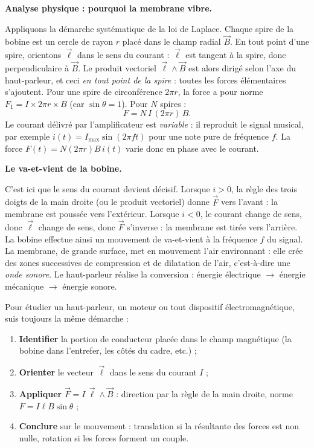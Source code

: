 \documentclass[11pt]{article}
\newcommand{\cle}[1]{{\popxbold\color{popdark}#1}}
\begin{document}
\textbf{Analyse physique : pourquoi la membrane vibre.}\par
Appliquons la démarche systématique de la loi de Laplace. Chaque spire de la bobine est un cercle de rayon $r$ placé dans le champ radial $\vec{B}$. En tout point d'une spire, orientons $\vec{\ell}$ dans le sens du courant : $\vec{\ell}$ est tangent à la spire, donc perpendiculaire à $\vec{B}$. Le produit vectoriel $\vec{\ell} \wedge \vec{B}$ est alors dirigé selon l'axe du haut-parleur, et ceci \emph{en tout point de la spire} : toutes les forces élémentaires s'ajoutent. Pour une spire de circonférence $2\pi r$, la force a pour norme $F_1 = I \times 2\pi r \times B$ (car $\sin\theta = 1$). Pour $N$ spires :
\[ F = N\,I\,(2\pi r)\,B. \]
Le courant délivré par l'amplificateur est \emph{variable} : il reproduit le signal musical, par exemple $i(t) = I_{\max}\sin(2\pi f t)$ pour une note pure de fréquence $f$. La force $F(t) = N(2\pi r)B\,i(t)$ varie donc en phase avec le courant.

\textbf{Le va-et-vient de la bobine.}\par
C'est ici que le sens du courant devient décisif. Lorsque $i > 0$, la règle des trois doigts de la main droite (ou le produit vectoriel) donne $\vec{F}$ vers l'avant : la membrane est poussée vers l'extérieur. Lorsque $i < 0$, le courant change de sens, donc $\vec{\ell}$ change de sens, donc $\vec{F}$ s'inverse : la membrane est tirée vers l'arrière. La bobine effectue ainsi un \cle{mouvement de va-et-vient} à la fréquence $f$ du signal. La membrane, de grande surface, met en mouvement l'air environnant : elle crée des zones successives de compression et de dilatation de l'air, c'est-à-dire une \emph{onde sonore}. Le haut-parleur réalise la conversion : énergie électrique $\rightarrow$ énergie mécanique $\rightarrow$ énergie sonore.

\begin{methode}
Pour étudier un haut-parleur, un moteur ou tout dispositif électromagnétique, suis toujours la même démarche :
\begin{enumerate}
\item \textbf{Identifier} la portion de conducteur placée dans le champ magnétique (la bobine dans l'entrefer, les côtés du cadre, etc.) ;
\item \textbf{Orienter} le vecteur $\vec{\ell}$ dans le sens du courant $I$ ;
\item \textbf{Appliquer} $\vec{F} = I\,\vec{\ell} \wedge \vec{B}$ : direction par la règle de la main droite, norme $F = I\ell B \sin\theta$ ;
\item \textbf{Conclure} sur le mouvement : translation si la résultante des forces est non nulle, rotation si les forces forment un couple.
\end{enumerate}
\end{methode}
\end{document}
